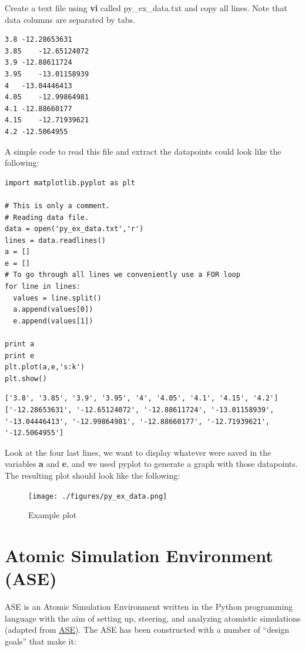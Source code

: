 \documentclass[11pt]{article}
\begin{document}
Create a text file using \textbf{vi} called py\_ex\_data.txt and copy all lines. Note that data columns are separated by tabs. 
\begin{verbatim}
3.8	-12.28653631
3.85	-12.65124072
3.9	-12.88611724
3.95	-13.01158939
4	-13.04446413
4.05	-12.99864981
4.1	-12.88660177
4.15	-12.71939621
4.2	-12.5064955
\end{verbatim}

A simple code to read this file and extract the datapoints could look like the following:
\begin{verbatim}
import matplotlib.pyplot as plt

# This is only a comment. 
# Reading data file.
data = open('py_ex_data.txt','r')
lines = data.readlines()
a = []
e = []
# To go through all lines we conveniently use a FOR loop
for line in lines:
  values = line.split()
  a.append(values[0])
  e.append(values[1])

print a
print e
plt.plot(a,e,'s:k')
plt.show()
\end{verbatim}

\begin{verbatim}
['3.8', '3.85', '3.9', '3.95', '4', '4.05', '4.1', '4.15', '4.2']
['-12.28653631', '-12.65124072', '-12.88611724', '-13.01158939', '-13.04446413', '-12.99864981', '-12.88660177', '-12.71939621', '-12.5064955']
\end{verbatim}

Look at the four last lines, we want to display whatever were saved in the variables \textbf{a} and \textbf{e}, and we used pyplot to generate a graph with those datapoints. The resulting plot should look like the following:

\begin{figure}[htb]
\centering
\texttt{[image: ./figures/py\_ex\_data.png]}
\caption{Example plot}
\end{figure}

\section{Atomic Simulation Environment (ASE)}
\label{sec-5}
ASE is an Atomic Simulation Environment written in the Python programming language with the aim of setting up, steering, and analyzing atomistic simulations (adapted from \href{https://wiki.fysik.dtu.dk/ase/about.html}{ASE}). The ASE has been constructed with a number of “design goals” that make it:
\end{document}
